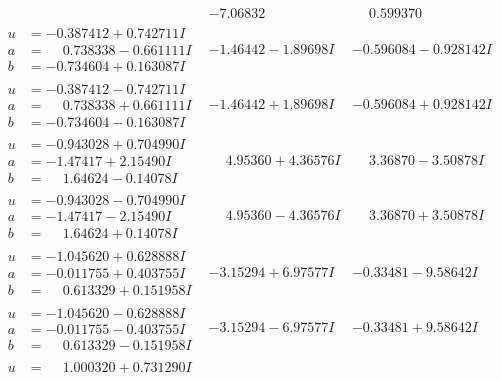 \documentclass[1p]{elsarticle_modified}
\theoremstyle{definition}
\begin{document}
$$\begin{array}{c|c|c}
 & -7.06832\phantom{ +0.000000I} & \phantom{-}0.599370\phantom{ +0.000000I} \\ \hline\begin{aligned}
u &= -0.387412 + 0.742711 I \\
a &= \phantom{-}0.738338 - 0.661111 I \\
b &= -0.734604 + 0.163087 I\end{aligned}
 & -1.46442 - 1.89698 I & -0.596084 - 0.928142 I \\ \hline\begin{aligned}
u &= -0.387412 - 0.742711 I \\
a &= \phantom{-}0.738338 + 0.661111 I \\
b &= -0.734604 - 0.163087 I\end{aligned}
 & -1.46442 + 1.89698 I & -0.596084 + 0.928142 I \\ \hline\begin{aligned}
u &= -0.943028 + 0.704990 I \\
a &= -1.47417 + 2.15490 I \\
b &= \phantom{-}1.64624 - 0.14078 I\end{aligned}
 & \phantom{-}4.95360 + 4.36576 I & \phantom{-}3.36870 - 3.50878 I \\ \hline\begin{aligned}
u &= -0.943028 - 0.704990 I \\
a &= -1.47417 - 2.15490 I \\
b &= \phantom{-}1.64624 + 0.14078 I\end{aligned}
 & \phantom{-}4.95360 - 4.36576 I & \phantom{-}3.36870 + 3.50878 I \\ \hline\begin{aligned}
u &= -1.045620 + 0.628888 I \\
a &= -0.011755 + 0.403755 I \\
b &= \phantom{-}0.613329 + 0.151958 I\end{aligned}
 & -3.15294 + 6.97577 I & -0.33481 - 9.58642 I \\ \hline\begin{aligned}
u &= -1.045620 - 0.628888 I \\
a &= -0.011755 - 0.403755 I \\
b &= \phantom{-}0.613329 - 0.151958 I\end{aligned}
 & -3.15294 - 6.97577 I & -0.33481 + 9.58642 I \\ \hline\begin{aligned}
u &= \phantom{-}1.000320 + 0.731290 I \\

\end{aligned}
\end{array}$$
\end{document}
